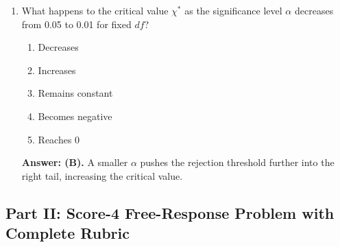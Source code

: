 \begin{enumerate}[leftmargin=1.5em]
  \item What happens to the critical value $\chi^*$ as the significance level $\alpha$ decreases from 0.05 to 0.01 for fixed $df$?
  \begin{enumerate}[label=(\Alph*)]
    \item Decreases \item Increases \item Remains constant \item Becomes negative \item Reaches 0
  \end{enumerate}
  \textbf{Answer: (B).} A smaller $\alpha$ pushes the rejection threshold further into the right tail, increasing the critical value.
\end{enumerate}

\subsection*{Part II: Score-4 Free-Response Problem with Complete Rubric}

